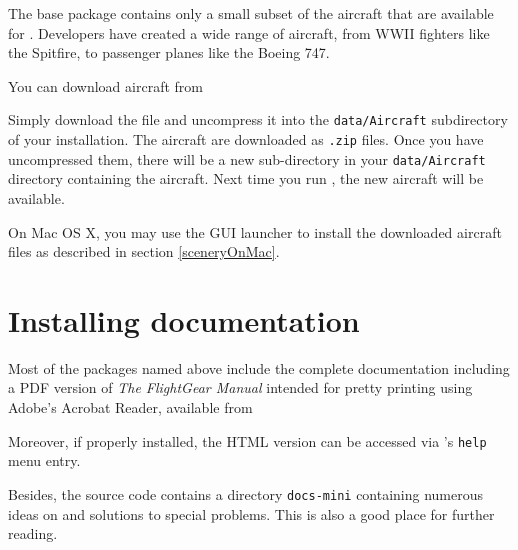 The base \FlightGear{} package contains only a small subset of the aircraft that are available for \FlightGear{}.
Developers have created a wide range of aircraft, from WWII fighters like the Spitfire, to passenger planes like the Boeing 747.

You can download aircraft from

\medskip
{}
\medskip

Simply download the file and uncompress it into the \texttt{data/Aircraft}
subdirectory of your installation. The aircraft are downloaded as \texttt{.zip}
files. Once you have uncompressed them, there will be a new sub-directory in your
\texttt{data/Aircraft} directory containing the aircraft. Next time you run
\FlightGear{}, the new aircraft will be available.

On Mac OS X, you may use the GUI launcher to install the downloaded aircraft files as described in section \ref{sceneryOnMac}.
 

\section{Installing documentation}

Most of the packages named above include the complete \FlightGear{}
documentation including a PDF version of \textit{The FlightGear
Manual} intended for pretty printing using Adobe's Acrobat Reader,
available from
\medskip

 \medskip

 \noindent
 Moreover, if properly installed, the HTML version can be accessed via
\FlightGear{}'s \texttt{help} menu entry.

Besides, the source code contains a directory \texttt{docs-mini} containing numerous
ideas on and solutions to special problems. This is also a good place for further
reading.


